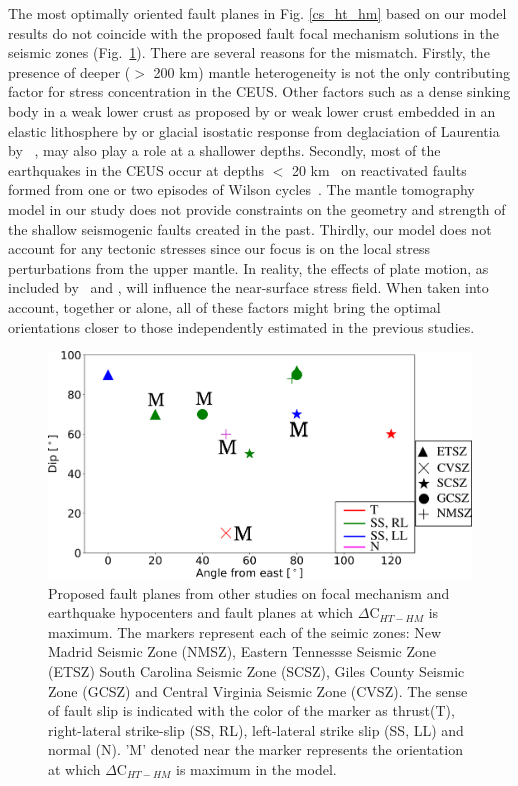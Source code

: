 \documentclass[draft,linenumbers]{agujournal2018}
\begin{document}
     The most optimally oriented fault planes in Fig. \ref{cs_ht_hm} based on our model results do not coincide with the proposed fault focal mechanism solutions in the seismic zones (Fig.~\ref{summary}). There are several reasons for the mismatch. Firstly, the presence of deeper ($>$ 200 km) mantle heterogeneity is not the only contributing factor for stress concentration in the CEUS. Other factors such as a dense sinking body in a weak lower crust as proposed by \citet{Pollitz_2001} or weak lower crust embedded in an elastic lithosphere by \citet{Kenner_2000a} or glacial isostatic response from deglaciation of Laurentia by ~\citet{Grollimund_2001}, may also play a role at a shallower depths.  Secondly, most of the earthquakes in the CEUS occur at depths $<$ 20 km~\citep[e.g.,][]{bollinger1985seismicity, chiu1992imaging, powell2016grenville} on reactivated faults formed from one or two episodes of Wilson cycles~\citep{thomas2006tectonic, wolin2012mineral}. The mantle tomography model in our study does not provide constraints on the geometry and strength of the shallow seismogenic faults created in the past. Thirdly, our model does not account for any tectonic stresses since our focus is on the local stress perturbations from the upper mantle. In reality, the effects of plate motion, as included by~\citet{zhan2016stress} and \citet{levandowski2016dense}, will influence the near-surface stress field. When taken into account, together or alone, all of these factors might bring the optimal orientations closer to those independently estimated in the previous studies.
%     
\begin{figure}[ht]
    \centering
    \includegraphics[width=0.8\linewidth]{figures/summ_stress.png}
    \caption{Proposed fault planes from other studies on focal mechanism and earthquake hypocenters and fault planes at which $\Delta$C$_{HT-HM}$ is maximum. The markers represent each of the seimic zones: New Madrid Seismic Zone (NMSZ), Eastern Tennessse Seismic Zone (ETSZ) South Carolina Seismic Zone (SCSZ), Giles County Seismic Zone (GCSZ) and Central Virginia Seismic Zone (CVSZ). The sense of fault slip is indicated with the color of the marker as thrust(T), right-lateral strike-slip (SS, RL), left-lateral strike slip (SS, LL) and normal (N). 'M' denoted near the marker represents the orientation at which $\Delta$C$_{HT-HM}$ is maximum in the model.}
    \label{summary}
\end{figure}
 
\end{document}
